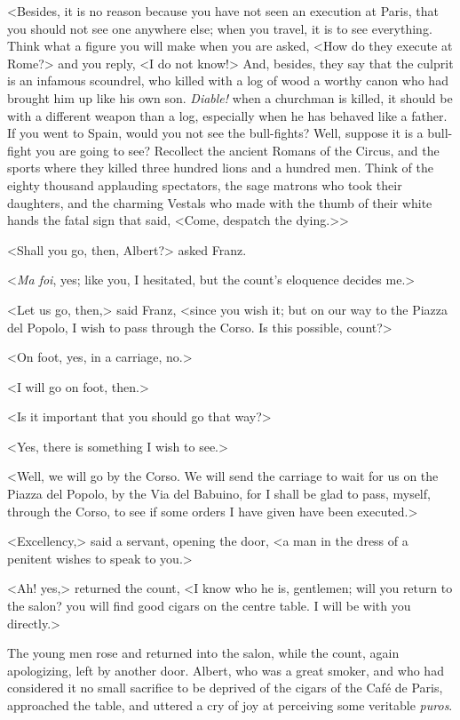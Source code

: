  <Besides, it is no reason because you have not seen an execution at Paris, that you should not see one anywhere else; when you travel, it is to see everything. Think what a figure you will make when you are asked, <How do they execute at Rome?> and you reply, <I do not know!> And, besides, they say that the culprit is an infamous scoundrel, who killed with a log of wood a worthy canon who had brought him up like his own son. \textit{Diable!} when a churchman is killed, it should be with a different weapon than a log, especially when he has behaved like a father. If you went to Spain, would you not see the bull-fights? Well, suppose it is a bull-fight you are going to see? Recollect the ancient Romans of the Circus, and the sports where they killed three hundred lions and a hundred men. Think of the eighty thousand applauding spectators, the sage matrons who took their daughters, and the charming Vestals who made with the thumb of their white hands the fatal sign that said, <Come, despatch the dying.>> 

 <Shall you go, then, Albert?> asked Franz. 

 <\textit{Ma foi}, yes; like you, I hesitated, but the count's eloquence decides me.> 

 <Let us go, then,> said Franz, <since you wish it; but on our way to the Piazza del Popolo, I wish to pass through the Corso. Is this possible, count?> 

 <On foot, yes, in a carriage, no.> 

 <I will go on foot, then.> 

 <Is it important that you should go that way?> 

 <Yes, there is something I wish to see.> 

 <Well, we will go by the Corso. We will send the carriage to wait for us on the Piazza del Popolo, by the Via del Babuino, for I shall be glad to pass, myself, through the Corso, to see if some orders I have given have been executed.> 

 <Excellency,> said a servant, opening the door, <a man in the dress of a penitent wishes to speak to you.> 

 <Ah! yes,> returned the count, <I know who he is, gentlemen; will you return to the salon? you will find good cigars on the centre table. I will be with you directly.> 

 The young men rose and returned into the salon, while the count, again apologizing, left by another door. Albert, who was a great smoker, and who had considered it no small sacrifice to be deprived of the cigars of the Café de Paris, approached the table, and uttered a cry of joy at perceiving some veritable \textit{puros}. 

